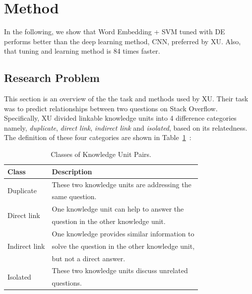 \documentclass[sigconf,review, anonymous]{acmart}
\theoremstyle{break}
\newcommand{\tab}[1]{Table~\ref{tab:#1}}
\begin{document}
\section{Method}\label{method}
In the following, 
we show that Word Embedding + SVM tuned with DE performs better than the deep learning method, CNN, preferred by XU.
Also, that tuning and learning method is 84 times faster. 
\subsection{Research Problem}\label{problem}



This section is an overview of the the task and methods 
used by XU. Their task was to  predict relationships between two questions on Stack Overflow. Specifically, 
XU  divided linkable knowledge  units 
into 4 difference categories namely, {\it duplicate}, {\it direct link}, {\it indirect link} and {\it isolated}, 
based on its relatedness. The definition of these four categories are shown in \tab{classes}~\cite{xu2016predicting}:
\begin{table}[!htp]
\caption{Classes of Knowledge Unit Pairs.}\label{tab:classes}
\centering
\begin{tabular}{l|l}
\hline
\rowcolor{lightgray}
Class & Description  \\\hline
\multirow{2}{*}{Duplicate} & These two knowledge units are addressing the\\
                           & same  question.\\ \hline
\multirow{2}{*}{Direct link}& One knowledge unit can help to  answer the\\ 
                         &  question in the other  knowledge unit.\\ \hline
\multirow{3}{*}{Indirect link}& One knowledge provides similar information to\\
                         &  solve the  question in the other knowledge unit, \\
                         &  but not a direct answer.\\ \hline
\multirow{2}{*}{Isolated}& These two knowledge units discuss unrelated \\
                         & questions.\\ \hline
\end{tabular}
\end{table}
\end{document}
